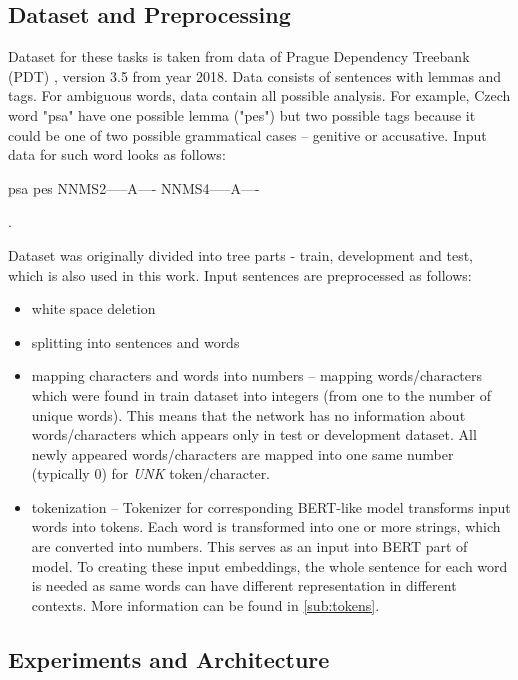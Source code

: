 \subsection{Dataset and Preprocessing}
\label{sub:dataset}
Dataset for these tasks is taken from data of Prague Dependency Treebank (PDT) \citep{PDT35}, version 3.5 from year 2018. %
Data consists of sentences with lemmas and tags. For ambiguous words, data contain all possible analysis. For example, Czech word "psa" have one possible lemma ("pes") but two possible tags because it could be one of two possible grammatical cases -- genitive or accusative. Input data for such word looks as follows: \\
\begin{center}
psa pes NNMS2-----A---- NNMS4-----A----
\end{center}.

Dataset was originally divided into tree parts - train, development and test, which is also used in this work. Input sentences are preprocessed as follows: %
\begin{itemize}
\item white space deletion
\item splitting into sentences and words
\item mapping characters and words into numbers -- mapping  words/characters which were found in train dataset into integers (from one to the number of unique words). This means that the network has no information about words/characters which appears only in test or development dataset. All newly appeared words/characters are mapped into one same number (typically $0$) for \textit{UNK} token/character.
\item tokenization -- Tokenizer for corresponding BERT-like model transforms input words into tokens. Each word is transformed into one or more strings, which are converted into numbers. This serves as an input into BERT part of model. To creating these input embeddings, the whole sentence for each word is needed as same words can have different representation in different contexts. More information can be found in \ref{sub:tokens}.
\end{itemize}

\subsection{Experiments and Architecture}

